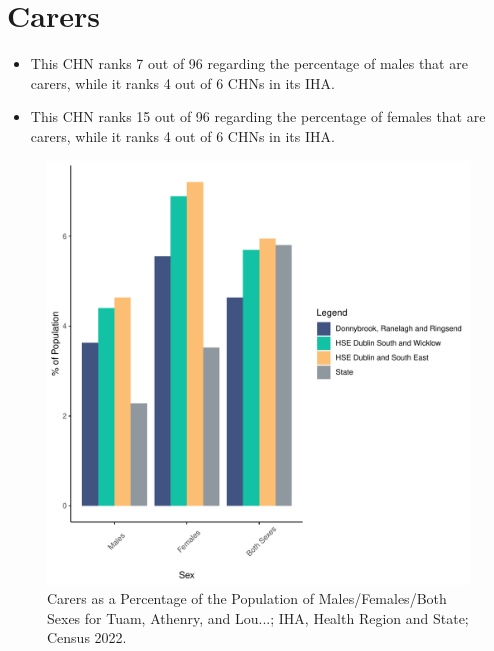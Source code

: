 \documentclass{article}
\begin{document}
\section{Carers}\label{sect:Carers}
\begin{itemize}
\item This CHN ranks  7 out of 96 regarding the percentage of males that are carers, while it ranks   4 out of 6 CHNs in its IHA.
\item This CHN ranks  15 out of 96 regarding the percentage of females that are carers, while it ranks   4 out of 6 CHNs in its IHA.
\end{itemize}
\begin{figure}[H]
	\centering
	\includegraphics[width = 150mm]{../figures/CareED.pdf}
	\caption{Carers as a Percentage of the Population of Males/Females/Both Sexes for Tuam, Athenry, and Lou...; IHA, Health Region and State; Census 2022.}
	\label{fig:2ae19629-1a6a-13a3-e055-000000000001}
	\end{figure}
\end{document}
